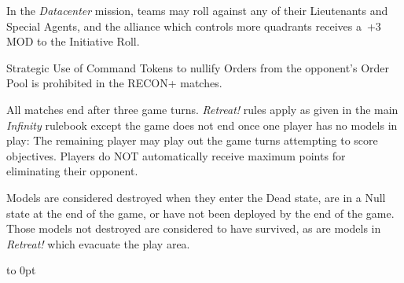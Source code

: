 In the \textit{Datacenter} mission, teams may roll against any of
their Lieutenants and Special Agents, and the alliance which controls
more quadrants receives a~+3 MOD to the Initiative Roll.

  Strategic Use of Command Tokens
to nullify Orders from the opponent's Order Pool is prohibited in the
RECON+ matches.

  All matches end after three game turns.
\emph{Retreat!} rules apply as given in the main \emph{Infinity}
rulebook except the game does not end once one player has no models in
play: The remaining player may play out the game turns attempting to
score objectives.  Players do NOT automatically receive maximum points
for eliminating their opponent.

 Models are considered destroyed when they
enter the Dead state, are in a Null state at the end of the game, or
have not been deployed by the end of the game.  Those models not
destroyed are considered to have survived, as are models in
\emph{Retreat!} which evacuate the play area.

\vfill
\vbox to 0pt{}
